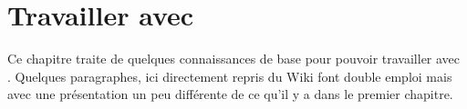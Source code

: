\chapter{Travailler avec \codeblocks}

Ce chapitre traite de quelques connaissances de base pour pouvoir travailler avec \codeblocks. Quelques paragraphes, ici directement repris du Wiki font double emploi mais avec une présentation un peu différente de ce qu'il y a dans le premier chapitre.

\begin{BUILDPROCESS}

\end{BUILDPROCESS}

\begin{CREATEPROJECT}

\end{CREATEPROJECT}

\begin{DEBUGGING}

\end{DEBUGGING}

\begin{DEBUGGERSCRIPTS}

\end{DEBUGGERSCRIPTS}

\begin{MAKEFILES}

\end{MAKEFILES}

\begin{CBP2MAKE}

\end{CBP2MAKE}

\begin{INTERNATIONALIZATION}

\end{INTERNATIONALIZATION}
